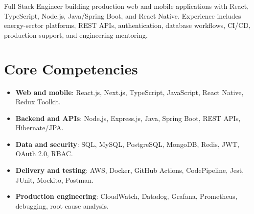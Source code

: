 \documentclass[11pt,a4paper,sans]{moderncv}
\begin{document}
\makecvtitle


\vspace{6pt}
\small{Full Stack Engineer building production web and mobile applications with React, TypeScript, Node.js, Java/Spring Boot, and React Native. Experience includes energy-sector platforms, REST APIs, authentication, database workflows, CI/CD, production support, and engineering mentoring.}


\section{Core Competencies}
\vspace{1pt}
\begin{itemize}

\item \textbf{Web and mobile}: React.js, Next.js, TypeScript, JavaScript, React Native, Redux Toolkit.

\item \textbf{Backend and APIs}: Node.js, Express.js, Java, Spring Boot, REST APIs, Hibernate/JPA.

\item \textbf{Data and security}: SQL, MySQL, PostgreSQL, MongoDB, Redis, JWT, OAuth 2.0, RBAC.

\item \textbf{Delivery and testing}: AWS, Docker, GitHub Actions, CodePipeline, Jest, JUnit, Mockito, Postman.

\item \textbf{Production engineering}: CloudWatch, Datadog, Grafana, Prometheus, debugging, root cause analysis.

\end{itemize}

\end{document}
